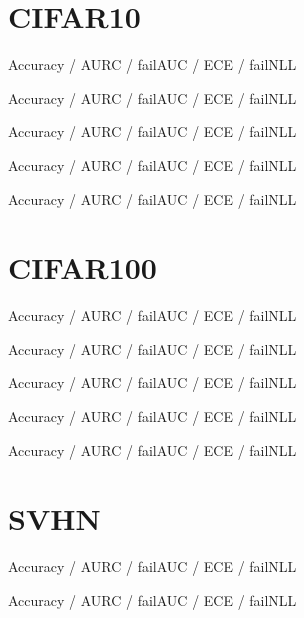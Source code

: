\documentclass{article}
\begin{document}
    \section{CIFAR10}
    Accuracy / AURC / failAUC / ECE / failNLL

    
    \pagebreak

    Accuracy / AURC / failAUC / ECE / failNLL

    
    \pagebreak

    Accuracy / AURC / failAUC / ECE / failNLL

    
    \pagebreak

    Accuracy / AURC / failAUC / ECE / failNLL

    
    \pagebreak

    Accuracy / AURC / failAUC / ECE / failNLL

    
    \pagebreak

    \section{CIFAR100}
    Accuracy / AURC / failAUC / ECE / failNLL

    
    \pagebreak

    Accuracy / AURC / failAUC / ECE / failNLL

    
    \pagebreak

    Accuracy / AURC / failAUC / ECE / failNLL

    
    \pagebreak

    Accuracy / AURC / failAUC / ECE / failNLL

    
    \pagebreak

    Accuracy / AURC / failAUC / ECE / failNLL

    
    \pagebreak

    \section{SVHN}
    Accuracy / AURC / failAUC / ECE / failNLL

    
    \pagebreak

    Accuracy / AURC / failAUC / ECE / failNLL
\end{document}
